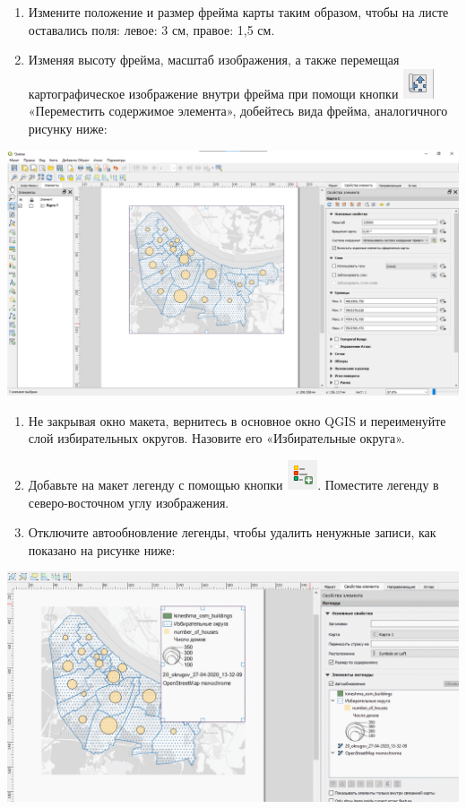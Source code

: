\documentclass[
  12pt,
]{book}
\begin{document}
\begin{enumerate}
\def\labelenumi{\arabic{enumi}.}
\setcounter{enumi}{4}
\item
  Измените положение и размер фрейма карты таким образом, чтобы на листе оставались поля: левое: 3 см, правое: 1,5 см.
\item
  Изменяя высоту фрейма, масштаб изображения, а также перемещая картографическое изображение внутри фрейма при помощи кнопки \includegraphics{images/Ex05_Vectorization/button_moveelement.png} «Переместить содержимое элемента», добейтесь вида фрейма, аналогичного рисунку ниже:
\end{enumerate}

\includegraphics{images/Ex05_Vectorization/map_frame.png}

\begin{enumerate}
\def\labelenumi{\arabic{enumi}.}
\setcounter{enumi}{6}
\item
  Не закрывая окно макета, вернитесь в основное окно QGIS и переименуйте слой избирательных округов. Назовите его «Избирательные округа».
\item
  Добавьте на макет легенду с помощью кнопки \includegraphics{images/Ex05_Vectorization/button_addlegend.png}. Поместите легенду в северо-восточном углу изображения.
\item
  Отключите автообновление легенды, чтобы удалить ненужные записи, как показано на рисунке ниже:
\end{enumerate}

\includegraphics{images/Ex05_Vectorization/legend_deleteelements.gif}
\end{document}
